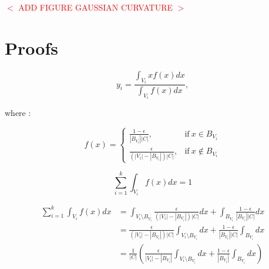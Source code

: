 \documentclass[11pt,fleqn]{book} %
\newcommand{\arnaud}[1]{\textcolor{red}{$<$ #1 $>$}}
\begin{document}
\begin{appendices}
\arnaud{ADD FIGURE GAUSSIAN CURVATURE}

\section{Proofs}

\begin{equation}
	y_i = \frac{\int_{V_i}xf(x)dx}{\int_{V_i}f(x)dx},
\end{equation}

where : 

\begin{equation}
	f(x) = 
    \begin{cases}
      \frac{1-\epsilon}{|B_{V_i}||C|}, & \text{if}\ x \in B_{V_i} \\
      \frac{\epsilon}{(|V_i|-|B_{V_i}|)|C|}, & \text{if}\ x \not\in B_{V_i}
    \end{cases}
\end{equation}

\begin{equation}
	\sum_{i=1}^k \int_{V_i}f(x)dx = 1
\end{equation}

\begin{align*}
	\sum_{i=1}^k \int_{V_i}f(x)dx 
	&= \int_{V_i \setminus B_{V_i}}\frac{\epsilon}{(|V_i|-|B_{V_i}|)|C|}dx + \int_{B_{V_i}}\frac{1-\epsilon}{|B_{V_i}||C|}dx \\
	&= \frac{\epsilon}{(|V_i|-|B_{V_i}|)|C|}\int_{V_i \setminus B_{V_i}}dx + \frac{1-\epsilon}{|B_{V_i}||C|}\int_{B_{V_i}}dx \\
	&= \frac{1}{|C|}(\frac{\epsilon}{|V_i|-|B_{V_i}|}\int_{V_i \setminus B_{V_i}}dx + \frac{1-\epsilon}{|B_{V_i}|}\int_{B_{V_i}}dx)
\end{align*}

\end{appendices}

\end{document}
